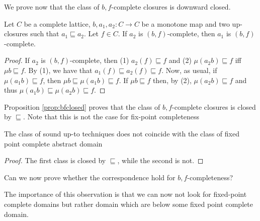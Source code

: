 \documentclass{llncs}
\begin{document}
We prove now that the class of $b,f$-complete closures is downward closed. %
%

\begin{proposition}\label{prop:bfclosed} Let $C$ be a complete lattice, $b,a_1,a_2\colon C \to C$ be a monotone map and two up-closures such that $a_1\sqsubseteq a_2$. Let $f\in C$. If $a_2$ is $(b,f)$-complete, then $a_1$ is $(b,f)$-complete.
\end{proposition}
\begin{proof}
If $a_2$ is $(b,f)$-complete, then (1) $a_2(f)\sqsubseteq f$ and (2) $ \mu (a_2 b) \sqsubseteq f$ iff  $\mu b \sqsubseteq f$. By (1), we have that $a_1(f)\sqsubseteq a_2(f)\sqsubseteq f$.
Now, as usual, if $\mu(a_1b)\sqsubseteq f$, then  $\mu b\sqsubseteq \mu(a_1b)\sqsubseteq f$. If $\mu b \sqsubseteq f$ then, by (2), $ \mu (a_2 b) \sqsubseteq f$ and thus  $\mu (a_1 b) \sqsubseteq  \mu (a_2 b) \sqsubseteq f$.
\end{proof}

Proposition \ref{prop:bfclosed} proves that the class of $b,f$-complete closures is closed by $\sqsubseteq$. Note that this is not the case for fix-point completeness

\begin{theorem}
The class of sound up-to techniques does not coincide with the class of fixed point complete abstract domain
\end{theorem}
\begin{proof}
The first class is closed by $\sqsubseteq$, while the second is not.
\end{proof}

Can we now prove whether the correspondence hold for $b,f$-completeness?

The importance of this observation is that we can now not look for fixed-point complete domains but rather domain which are below some fixed point complete domain.
\end{document}
